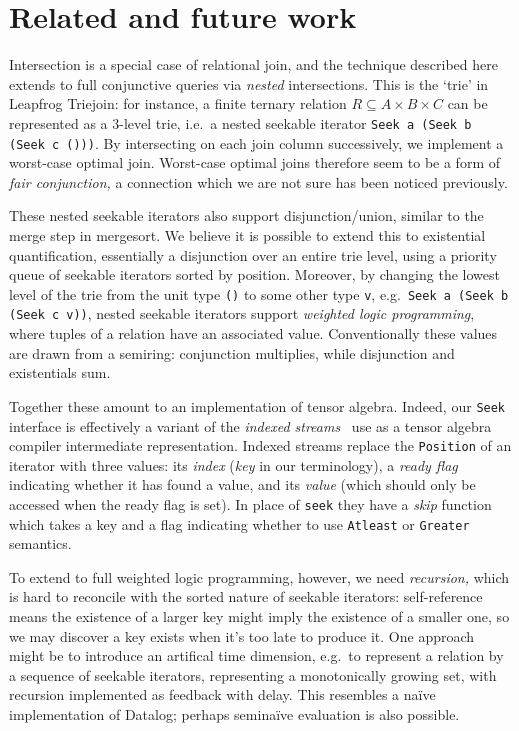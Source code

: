 \documentclass[acmsmall,screen,review,anonymous,dvipsnames,svgnames]{acmart}
\newcommand\hask[1]{\texttt{#1}}
\newcommand\ttt\texttt
\newcommand\todo[1]{{\color{Orange}#1}}
\renewcommand\todo[1]{{\color{IndianRed}#1}}
\renewcommand\todo[1]{\ignorespaces}
\begin{document}

\section{Related and future work}

Intersection is a special case of relational join, and the technique described here extends to full conjunctive queries via \emph{nested} intersections.
This is the `trie' in Leapfrog Triejoin: for instance, a finite ternary relation $R \subseteq A \times B \times C$ can be represented as a 3-level trie, i.e.\ a nested seekable iterator \hask{Seek a (Seek b (Seek c ()))}.
By intersecting on each join column successively, we implement a worst-case optimal join.
Worst-case optimal joins therefore seem to be a form of \emph{fair conjunction,} a connection which we are not sure has been noticed previously.

These nested seekable iterators also support disjunction/union, similar to the merge step in mergesort.
We believe it is possible to extend this to existential quantification, essentially a disjunction over an entire trie level, using a priority queue of seekable iterators sorted by position.
Moreover, by changing the lowest level of the trie from the unit type \ttt{()} to some other type \ttt{v}, e.g.\ \hask{Seek a (Seek b (Seek c v))}, nested seekable iterators support \emph{weighted logic programming}, where tuples of a relation have an associated value.
Conventionally these values are drawn from a semiring: conjunction multiplies, while disjunction and existentials sum.

Together these amount to an implementation of tensor algebra.
Indeed, our \hask{Seek} interface is effectively a variant of the \emph{indexed streams}~\citet{indexed-streams} use as a tensor algebra compiler intermediate representation.
Indexed streams replace the \hask{Position} of an iterator with three values: its \emph{index} (\emph{key} in our terminology), a \emph{ready flag} indicating whether it has found a value, and its \emph{value} (which should only be accessed when the ready flag is set).
In place of \hask{seek} they have a \emph{skip} function which takes a key and a flag indicating whether to use \hask{Atleast} or \hask{Greater} semantics.
\todo{all their key/index types are bounded so they don't need \hask{Done}---is this accurate?}

To extend to full weighted logic programming, however, we need \emph{recursion,} which is hard to reconcile with the sorted nature of seekable iterators: self-reference means the existence of a larger key might imply the existence of a smaller one, so we may discover a key exists when it's too late to produce it.
One approach might be to introduce an artifical time dimension, e.g.\ to represent a relation by a sequence of seekable iterators, representing a monotonically growing set, with recursion implemented as feedback with delay.
This resembles a na\"ive implementation of Datalog; perhaps semina\"ive evaluation is also possible.



\end{document}
